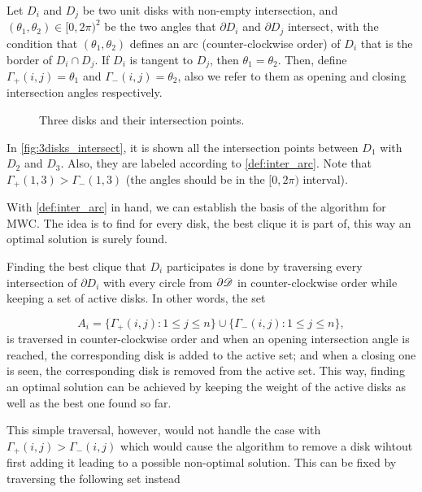 \begin{definicao}\label{def:inter_arc}
    Let $D_i$ and $D_j$ be two unit disks with non-empty intersection, and $(\theta_1, \theta_2) \in [0,2\pi)^2$ be the two angles that $\partial D_i$ and $\partial D_j$ intersect, with the condition that $(\theta_1,\theta_2)$ defines an arc (counter-clockwise order) of $D_i$ that is the border of $D_i \cap D_j$. If $D_i$ is tangent to $D_j$, then $\theta_1=\theta_2$. Then, define $\Gamma_+(i,j) = \theta_1$ and $\Gamma_-(i,j) = \theta_2$, also we refer to them as opening and closing intersection angles respectively.
\end{definicao}

\begin{figure}[H]
\centering

    \caption{Three disks and their intersection points.}
    
    \fautor
    \label{fig:3disks_intersect}
\end{figure}

In \autoref{fig:3disks_intersect}, it is shown all the intersection points between $D_1$ with $D_2$ and $D_3$. Also, they are labeled according to \autoref{def:inter_arc}. Note that $\Gamma_+(1,3) > \Gamma_-(1,3)$ (the angles should be in the $[0,2\pi)$ interval).

With \autoref{def:inter_arc} in hand, we can establish the basis of the algorithm for MWC.
The idea is to find for every disk, the best clique it is part of, this way an optimal solution is surely found.

Finding the best clique that $D_i$ participates is done by traversing every intersection of $\partial D_i$ with every circle from $\partial \mathscr{D}$ in counter-clockwise order while keeping a set of active disks. In other words, the set

\begin{equation}
A_i = \{\Gamma_+(i,j) : 1 \le j \le n\} \cup \{\Gamma_-(i,j) : 1 \le j \le n\},
\end{equation}
is traversed in counter-clockwise order and when an opening intersection angle is reached, the corresponding disk is added to the active set; and when a closing one is seen, the corresponding disk is removed from the active set. This way, finding an optimal solution can be achieved by keeping the weight of the active disks as well as the best one found so far.

This simple traversal, however, would not handle the case with $\Gamma_+(i,j) > \Gamma_-(i,j)$ which would cause the algorithm to remove a disk wihtout first adding it leading to a possible non-optimal solution. 
This can be fixed by traversing the following set instead

